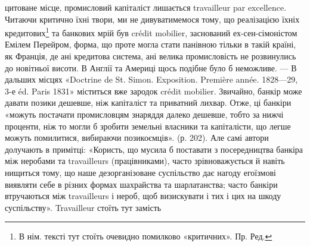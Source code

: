 цитоване місце, промисловий капіталіст лишається travailleur par excellence. Читаючи
критично їхні твори, ми не дивуватимемося тому, що реалізацією їхніх кредитових\footnote*{
В нім. тексті тут стоїть очевидно помилково «критичних». Пр. Ред.
}
та банкових мрій був crédit mobilier, заснований ех-сен-сімоністом Емілем
Перейром, форма, що проте могла стати панівною тільки в такій країні, як
Франція, де ані кредитова система, ані велика промисловість не розвинулись
до новітньої висоти. В Англії та Америці щось подібне було б неможливе. —
В дальших місцях «Doctrine de St. Simon. Exposition. Première année. 1828—29,
3-е éd. Paris 1831» міститься вже зародок crédit mobilier. Звичайно,
банкір може давати позики дешевше, ніж капіталіст та приватний лихвар.
Отже, ці банкіри «можуть постачати промисловцям знаряддя далеко дешевше,
тобто за нижчі проценти, ніж то могли б зробити земельні власники
та капіталісти, що легше можуть помилитися, вибираючи позикоємців».
(р. 202). Але самі автори долучають в примітці: «Користь, що мусила б поставати
з посередництва банкіра між неробами та travailleurs (працівниками),
часто зрівноважується й навіть нищиться тому, що наше дезорганізоване суспільство
дає нагоду егоїзмові виявляти себе в різних формах шахрайства та
шарлатанства; часто банкіри втручаються між travailleurs і нероб, щоб визискувати
і тих і цих на шкоду суспільству». Travailleur стоїть тут замість
\parbreak{}  %
